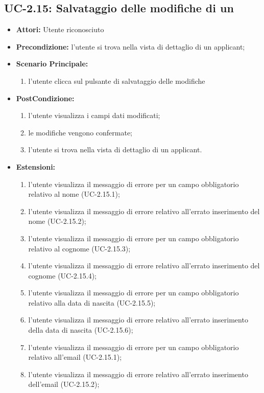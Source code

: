 \subsection{UC-2.15: Salvataggio delle modifiche di un \applicant}
\begin{itemize}
	\item \textbf{Attori:} Utente riconosciuto
	\item \textbf{Precondizione:}  l'utente si trova nella vista di dettaglio di un applicant;
	\item \textbf{Scenario Principale:}
	\begin{enumerate}
		\item l'utente clicca sul pulsante di salvataggio delle modifiche
	\end{enumerate}
	\item \textbf{PostCondizione:} 
	\begin{enumerate}
		\item l'utente visualizza i campi dati modificati;
		\item le modifiche vengono confermate;
		\item l'utente si trova nella vista di dettaglio di un applicant.
	\end{enumerate}
	
	\item \textbf{Estensioni:} 
	\begin{enumerate}
		\item l'utente visualizza il messaggio di errore per un campo obbligatorio relativo al nome (UC-2.15.1);		
		\item l'utente visualizza il messaggio di errore relativo all'errato inserimento del nome (UC-2.15.2);
		\item l'utente visualizza il messaggio di errore per un campo obbligatorio relativo al cognome (UC-2.15.3);
		\item l'utente visualizza il messaggio di errore relativo all'errato inserimento del cognome (UC-2.15.4);
		\item l'utente visualizza il messaggio di errore per un campo obbligatorio relativo alla data di nascita (UC-2.15.5);		
		\item l'utente visualizza il messaggio di errore relativo all'errato inserimento della data di nascita (UC-2.15.6);	
		\item l'utente visualizza il messaggio di errore per un campo obbligatorio relativo all'email (UC-2.15.1);		
		\item l'utente visualizza il messaggio di errore relativo all'errato inserimento dell'email (UC-2.15.2);
	\end{enumerate}
\end{itemize}

